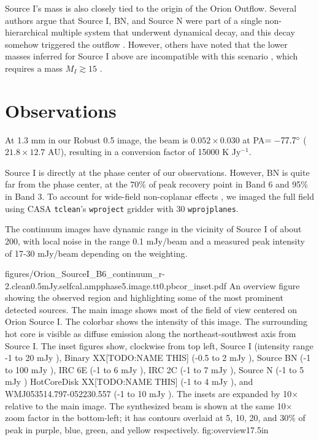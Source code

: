 \documentclass[twocolumn]{aastex61}
\begin{document}
Source I's mass is also closely tied to the origin of the Orion Outflow.
Several authors argue that Source I, BN, and Source N \citep[or, alternatively,
source X][]{Luhman2017a} were part of a single non-hierarchical multiple system
that underwent dynamical decay, and this decay somehow triggered the outflow
\citep{Bally2005a,Rodriguez2005a,Goddi2010a,Bally2011a,Bally2015a,Bally2017a}.  However, others have
noted that the lower masses inferred for Source I above are incompatible with
this scenario \citep{Chatterjee2012a,Farias2017a,Plambeck2016a}, which requires
a mass $M_{I} \gtrsim 15$ \msun.

\section{Observations}

At 1.3 mm in our Robust 0.5 image, the beam is $0.052\times0.030$ \arcsec at
PA$=-77.7^{\circ}$ ($21.8\times12.7$ AU), resulting in a 
conversion factor of 15000 K Jy$^{-1}$.

Source I is directly at the phase center of our observations.  However,
BN is quite far from the phase center, at the 70\% of peak recovery
point in Band 6 and 95\% in Band 3.  
{\color{red}To account for wide-field non-coplanar effects \citep{Cornwell2008a},
we imaged the full field using CASA \texttt{tclean}'s \texttt{wproject} gridder
with 30 \texttt{wprojplanes}.}

The continuum images have dynamic range in the vicinity of Source I of about 200,
with local noise in the range 0.1 mJy/beam and a measured peak intensity of 17-30
mJy/beam depending on the weighting.

\Figure
{figures/Orion_SourceI_B6_continuum_r-2.clean0.5mJy.selfcal.ampphase5.image.tt0.pbcor_inset.pdf}
{An overview figure showing the observed region and highlighting some of
the most prominent detected sources.
The main image shows most of the field of view centered on Orion Source I.
The colorbar shows the intensity of this image.
The surrounding hot core is visible as diffuse emission along the northeast-southwest
axis from Source I.
The inset figures show, clockwise from top left, 
Source I (intensity range -1 to 20 mJy \perbeam),
Binary XX[TODO:NAME THIS] (-0.5 to 2 mJy \perbeam),
Source BN (-1 to 100 mJy \perbeam),
IRC 6E (-1 to 6 mJy \perbeam),
IRC 2C (-1 to 7 mJy \perbeam),
Source N (-1 to 5 mJy \perbeam)
HotCoreDisk XX[TODO:NAME THIS] (-1 to 4 mJy \perbeam),
and
WMJ053514.797-052230.557 (-1 to 10 mJy \perbeam).
The insets are expanded by 10$\times$ relative to the main image.
The synthesized beam is shown at the same 10$\times$ zoom factor in the
bottom-left; it has contours overlaid at 5, 10, 20, and 30\% of peak
in purple, blue, green, and yellow respectively.
}
{fig:overview}{1}{7.5in}
\end{document}
